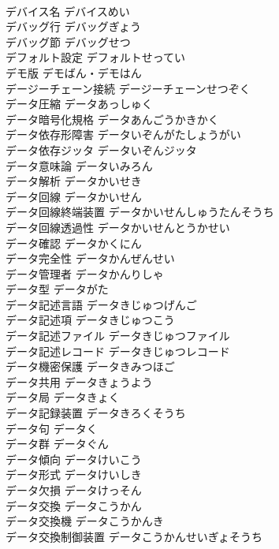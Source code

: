 \documentclass[8pt]{extreport}
\begin{document}
\begin{CJK}{UTF8}{min}
\\	デバイス名	デバイスめい	
\\	デバッグ行	デバッグぎょう	
\\	デバッグ節	デバッグせつ	
\\	デフォルト設定	デフォルトせってい	
\\	デモ版	デモばん・デモはん	
\\	デージーチェーン接続	デージーチェーンせつぞく	
\\	データ圧縮	データあっしゅく	
\\	データ暗号化規格	データあんごうかきかく	
\\	データ依存形障害	データいぞんがたしょうがい	
\\	データ依存ジッタ	データいぞんジッタ	
\\	データ意味論	データいみろん	
\\	データ解析	データかいせき	
\\	データ回線	データかいせん	
\\	データ回線終端装置	データかいせんしゅうたんそうち	
\\	データ回線透過性	データかいせんとうかせい	
\\	データ確認	データかくにん	
\\	データ完全性	データかんぜんせい	
\\	データ管理者	データかんりしゃ	
\\	データ型	データがた	
\\	データ記述言語	データきじゅつげんご	
\\	データ記述項	データきじゅつこう	
\\	データ記述ファイル	データきじゅつファイル	
\\	データ記述レコード	データきじゅつレコード	
\\	データ機密保護	データきみつほご	
\\	データ共用	データきょうよう	
\\	データ局	データきょく	
\\	データ記録装置	データきろくそうち	
\\	データ句	データく	
\\	データ群	データぐん	
\\	データ傾向	データけいこう	
\\	データ形式	データけいしき	
\\	データ欠損	データけっそん	
\\	データ交換	データこうかん	
\\	データ交換機	データこうかんき	
\\	データ交換制御装置	データこうかんせいぎょそうち	

\end{CJK}
\end{document}
